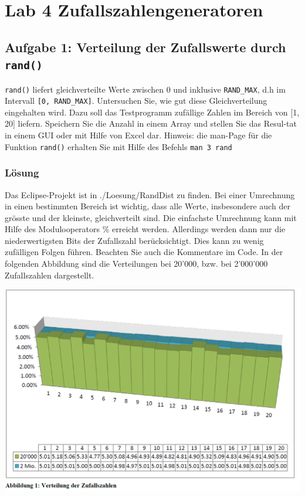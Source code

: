 \section{Lab 4 Zufallszahlengeneratoren}
\subsection{Aufgabe 1: Verteilung der Zufallswerte durch \texttt{rand()}}

\texttt{rand()} liefert gleichverteilte Werte zwischen 0 und inklusive \texttt{RAND\_MAX}, d.h im Intervall \texttt{[0, RAND\_MAX]}. Untersuchen Sie, wie gut diese Gleichverteilung eingehalten wird. Dazu soll das Testprogramm zufällige Zahlen im Bereich von [1, 20] liefern. Speichern Sie die Anzahl in einem Array und stellen Sie das Resul-tat in einem GUI oder mit Hilfe von Excel dar.
Hinweis: die man-Page für die Funktion \texttt{rand()} erhalten Sie mit Hilfe des Befehls \texttt{man 3 rand}

\subsubsection{Lösung}

Das Eclipse-Projekt ist in ./Loesung/RandDist zu finden. Bei einer Umrechnung in einen bestimmten Bereich ist wichtig, dass alle Werte, insbesondere auch der grösste und der kleinste, gleichverteilt sind. Die einfachste Umrechnung kann mit Hilfe des Modulooperators \% erreicht werden. Allerdings werden dann nur die niederwertigsten Bits der Zufallszahl berücksichtigt. Dies kann zu wenig zufälligen Folgen führen. Beachten Sie auch die Kommentare im Code.
In der folgenden Abbildung sind die Verteilungen bei 20'000, bzw. bei 2'000'000 Zufallszahlen dargestellt.

\includegraphics[width=.8\linewidth]{900-Praktika/prak04/pic.PNG}


